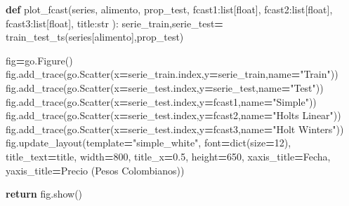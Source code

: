 \documentclass[
]{book}
\newenvironment{Shaded}{\begin{snugshade}}{\end{snugshade}}
\newcommand{\BuiltInTok}[1]{#1}
\newcommand{\ControlFlowTok}[1]{\textcolor[rgb]{0.13,0.29,0.53}{\textbf{#1}}}
\newcommand{\DecValTok}[1]{\textcolor[rgb]{0.00,0.00,0.81}{#1}}
\newcommand{\FloatTok}[1]{\textcolor[rgb]{0.00,0.00,0.81}{#1}}
\newcommand{\KeywordTok}[1]{\textcolor[rgb]{0.13,0.29,0.53}{\textbf{#1}}}
\newcommand{\NormalTok}[1]{#1}
\newcommand{\OperatorTok}[1]{\textcolor[rgb]{0.81,0.36,0.00}{\textbf{#1}}}
\newcommand{\StringTok}[1]{\textcolor[rgb]{0.31,0.60,0.02}{#1}}
\begin{document}
\begin{Shaded}
\begin{Highlighting}[]


\KeywordTok{def}\NormalTok{ plot\_fcast(series,}
\NormalTok{               alimento,}
\NormalTok{               prop\_test,}
\NormalTok{               fcast1:}\BuiltInTok{list}\NormalTok{[}\BuiltInTok{float}\NormalTok{],}
\NormalTok{               fcast2:}\BuiltInTok{list}\NormalTok{[}\BuiltInTok{float}\NormalTok{],}
\NormalTok{               fcast3:}\BuiltInTok{list}\NormalTok{[}\BuiltInTok{float}\NormalTok{],}
\NormalTok{               title:}\BuiltInTok{str}
\NormalTok{               ):}
\NormalTok{      serie\_train,serie\_test}\OperatorTok{=}\NormalTok{ train\_test\_ts(series[alimento],prop\_test)}
      
\NormalTok{      fig}\OperatorTok{=}\NormalTok{go.Figure()}
\NormalTok{      fig.add\_trace(go.Scatter(x}\OperatorTok{=}\NormalTok{serie\_train.index,y}\OperatorTok{=}\NormalTok{serie\_train,name}\OperatorTok{=}\StringTok{"Train"}\NormalTok{))}
\NormalTok{      fig.add\_trace(go.Scatter(x}\OperatorTok{=}\NormalTok{serie\_test.index,y}\OperatorTok{=}\NormalTok{serie\_test,name}\OperatorTok{=}\StringTok{"Test"}\NormalTok{))}
\NormalTok{      fig.add\_trace(go.Scatter(x}\OperatorTok{=}\NormalTok{serie\_test.index,y}\OperatorTok{=}\NormalTok{fcast1,name}\OperatorTok{=}\StringTok{"Simple"}\NormalTok{))}
\NormalTok{      fig.add\_trace(go.Scatter(x}\OperatorTok{=}\NormalTok{serie\_test.index,y}\OperatorTok{=}\NormalTok{fcast2,name}\OperatorTok{=}\StringTok{"Holt\textquotesingle{}s Linear"}\NormalTok{))}
\NormalTok{      fig.add\_trace(go.Scatter(x}\OperatorTok{=}\NormalTok{serie\_test.index,y}\OperatorTok{=}\NormalTok{fcast3,name}\OperatorTok{=}\StringTok{"Holt Winter\textquotesingle{}s"}\NormalTok{))}
\NormalTok{      fig.update\_layout(template}\OperatorTok{=}\StringTok{"simple\_white"}\NormalTok{, font}\OperatorTok{=}\BuiltInTok{dict}\NormalTok{(size}\OperatorTok{=}\DecValTok{12}\NormalTok{), title\_text}\OperatorTok{=}\NormalTok{title,}
\NormalTok{                      width}\OperatorTok{=}\DecValTok{800}\NormalTok{, title\_x}\OperatorTok{=}\FloatTok{0.5}\NormalTok{, height}\OperatorTok{=}\DecValTok{650}\NormalTok{, xaxis\_title}\OperatorTok{=}\StringTok{\textquotesingle{}Fecha\textquotesingle{}}\NormalTok{,}
\NormalTok{                      yaxis\_title}\OperatorTok{=}\StringTok{\textquotesingle{}Precio (Pesos Colombianos)\textquotesingle{}}\NormalTok{)}
      
      \ControlFlowTok{return}\NormalTok{ fig.show()}




\end{Highlighting}
\end{Shaded}
\end{document}
